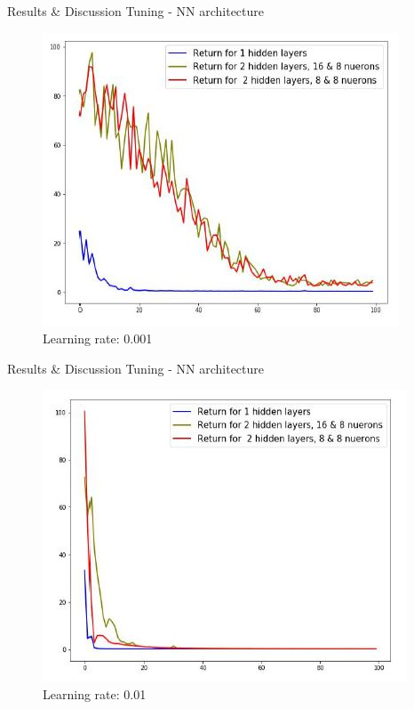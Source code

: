 \documentclass{beamer}
\begin{document}
\begin{frame}{Results \& Discussion }{Tuning - NN architecture\vphantom{(y}}
\vspace{-0.7em}
\begin{figure}
  \includegraphics[scale=0.7]{images/lr_low_a.JPG}
  \caption{Learning rate: 0.001}
\end{figure}
\end{frame}

\begin{frame}{Results \& Discussion }{Tuning - NN architecture\vphantom{(y}}
\vspace{-0.7em}
\begin{figure}
  \includegraphics[scale=0.7]{images/lr_med_a.JPG}
  \caption{Learning rate: 0.01}
\end{figure}
\end{frame}
\end{document}
